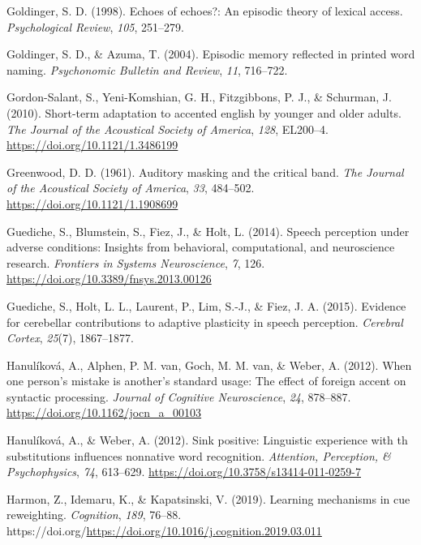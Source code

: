 \documentclass[
  11pt,
  man,floatsintext]{apa6}
\newlength{\cslhangindent}
\newlength{\cslentryspacingunit} %
\newenvironment{CSLReferences}[2] %
 {%
  \setlength{\parindent}{0pt}
  \ifodd #1
  \let\oldpar\par
  \def\par{\hangindent=\cslhangindent\oldpar}
  \fi
  \setlength{\parskip}{#2\cslentryspacingunit}
 }%
 {}
\begin{document}
\begin{CSLReferences}{1}{0}
\leavevmode{}%
Goldinger, S. D. (1998). Echoes of echoes?: An episodic theory of lexical access. \emph{Psychological Review}, \emph{105}, 251--279.

\leavevmode{}%
Goldinger, S. D., \& Azuma, T. (2004). Episodic memory reflected in printed word naming. \emph{Psychonomic Bulletin and Review}, \emph{11}, 716--722.

\leavevmode{}%
Gordon-Salant, S., Yeni-Komshian, G. H., Fitzgibbons, P. J., \& Schurman, J. (2010). Short-term adaptation to accented english by younger and older adults. \emph{The Journal of the Acoustical Society of America}, \emph{128}, EL200--4. \url{https://doi.org/10.1121/1.3486199}

\leavevmode{}%
Greenwood, D. D. (1961). Auditory masking and the critical band. \emph{The Journal of the Acoustical Society of America}, \emph{33}, 484--502. \url{https://doi.org/10.1121/1.1908699}

\leavevmode{}%
Guediche, S., Blumstein, S., Fiez, J., \& Holt, L. (2014). Speech perception under adverse conditions: Insights from behavioral, computational, and neuroscience research. \emph{Frontiers in Systems Neuroscience}, \emph{7}, 126. \url{https://doi.org/10.3389/fnsys.2013.00126}

\leavevmode{}%
Guediche, S., Holt, L. L., Laurent, P., Lim, S.-J., \& Fiez, J. A. (2015). Evidence for cerebellar contributions to adaptive plasticity in speech perception. \emph{Cerebral Cortex}, \emph{25}(7), 1867--1877.

\leavevmode{}%
Hanulíková, A., Alphen, P. M. van, Goch, M. M. van, \& Weber, A. (2012). When one person's mistake is another's standard usage: The effect of foreign accent on syntactic processing. \emph{Journal of Cognitive Neuroscience}, \emph{24}, 878--887. \url{https://doi.org/10.1162/jocn_a_00103}

\leavevmode{}%
Hanulíková, A., \& Weber, A. (2012). Sink positive: Linguistic experience with th substitutions influences nonnative word recognition. \emph{Attention, Perception, \& Psychophysics}, \emph{74}, 613--629. \url{https://doi.org/10.3758/s13414-011-0259-7}

\leavevmode{}%
Harmon, Z., Idemaru, K., \& Kapatsinski, V. (2019). Learning mechanisms in cue reweighting. \emph{Cognition}, \emph{189}, 76--88. https://doi.org/\url{https://doi.org/10.1016/j.cognition.2019.03.011}


\end{CSLReferences}
\end{document}
